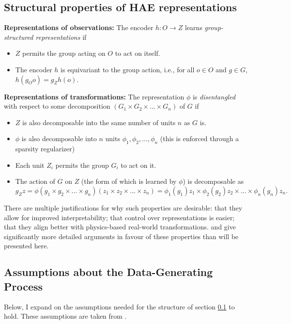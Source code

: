 \documentclass[10pt]{article} %
\begin{document}
 \subsection{Structural properties of HAE representations}
 \label{sec:structural_properties}
 \textbf{Representations of observations:} The encoder $h: O \rightarrow Z$ learns \textit{group-structured representations} \citep{higgins2018definition} if 
 \begin{itemize}
 \item $Z$ permits the group acting on $O$ to act on itself.
 \item The encoder $h$ is equivariant to the group action, i.e., for all $o \in O$ and $g \in G$, $h(g_Oo) = g_Zh(o)$.
 \end{itemize}
\newpage 
 \textbf{Representations of transformations:} The representation $\phi$ is \textit{disentangled} with respect to some decomposition $(G_1 \times G_2 \times ... \times G_n)$ of $G$ if 
 \begin{itemize}
 \item $Z$ is also decomposable into the same number of units $n$ as $G$ is.
 \item $\phi$ is also decomposable into $n$ units $\phi_1, \phi_2, ..., \phi_n$ (this is enforced through a sparsity regularizer)
 \item Each unit $Z_i$ permits the group $G_i$ to act on it.
 \item The action of $G$ on $Z$ (the form of which is learned by $\phi$) is decomposable as 
   \[ 
   g_Zz = \phi(g_1 \times g_2 \times ... \times g_n)(z_1 \times z_2 \times ... \times z_n) = \phi_1(g_1)z_1 \times \phi_2(g_2)z_2 \times ... \times \phi_n(g_n)z_n
   .\]
   
 \end{itemize}
 There are multiple justifications for why such properties are desirable: that they allow for improved interpretability; that control over representations is easier; that they align better with physics-based real-world transformations. \cite{higgins2018definition} and \cite{higgins2022symmetrybased} give significantly more detailed arguments in favour of these properties than will be presented here.

 
 \subsection{Assumptions about the Data-Generating Process}
 Below, I expand on the assumptions needed for the structure of section \ref{sec:structural_properties} to hold. These assumptions are taken from \cite{keurti2023homomorphism}.
\end{document}
